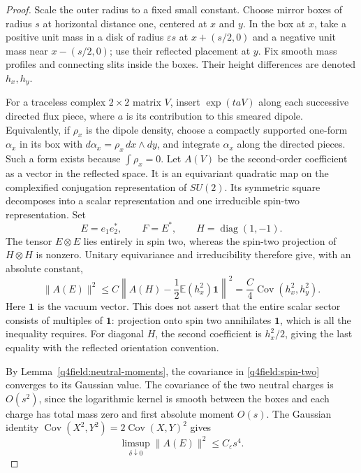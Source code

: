 \begin{proof}
Scale the outer radius to a fixed small constant.  Choose mirror boxes
of radius $s$ at horizontal distance one, centered at $x$ and $y$.
In the box at $x$, take a positive unit mass in a disk of radius
$\varepsilon s$ at $x+(s/2,0)$ and a negative unit mass near
$x-(s/2,0)$; use their reflected placement at $y$.  Fix smooth mass
profiles and connecting slits inside the boxes.  Their height
differences are denoted $h_x,h_y$.

For a traceless complex $2\times2$ matrix $V$, insert
$\exp(taV)$ along each successive directed flux piece, where $a$ is
its contribution to this smeared dipole.  Equivalently, if $\rho_x$
is the dipole density, choose a compactly supported one-form
$\alpha_x$ in its box with $d\alpha_x=\rho_x\,dx\wedge dy$,
and integrate $\alpha_x$ along the directed pieces.  Such a form
exists because $\int\rho_x=0$.  Let $A(V)$ be the
second-order coefficient as a vector in the reflected space.  It is
an equivariant quadratic map on the complexified conjugation
representation of $SU(2)$.  Its symmetric square decomposes into a
scalar representation and one irreducible spin-two representation.
Set
\[
 E=e_1e_2^*,\qquad F=E^*,\qquad H=\operatorname{diag}(1,-1).
\]
The tensor $E\otimes E$ lies entirely in spin two, whereas the
spin-two projection of $H\otimes H$ is nonzero.  Unitary equivariance
and irreducibility therefore give, with an absolute constant,
\begin{equation}\label{q4field:spin-two}
 \|A(E)\|^2
 \le C\left\|A(H)-\frac12\mathbb E(h_x^2)\mathbf1\right\|^2
 =\frac C4\operatorname{Cov}(h_x^2,h_y^2).
\end{equation}
Here $\mathbf1$ is the vacuum vector.  This does not assert that the
entire scalar sector consists of multiples of $\mathbf1$: projection
onto spin two annihilates $\mathbf1$, which is all the inequality
requires.  For diagonal $H$, the second coefficient is $h_x^2/2$,
giving the last equality with the reflected orientation convention.

By Lemma~\ref{q4field:neutral-moments}, the covariance in
\eqref{q4field:spin-two} converges to its Gaussian value.  The covariance
of the two neutral charges is $O(s^2)$, since the logarithmic kernel
is smooth between the boxes and each charge has total mass zero and
first absolute moment $O(s)$.  The Gaussian identity
$\operatorname{Cov}(X^2,Y^2)=2\operatorname{Cov}(X,Y)^2$ gives
\begin{equation}\label{q4field:spin-upper}
 \limsup_{\delta\downarrow0}\|A(E)\|^2\le C_\varepsilon s^4.
\end{equation}


\end{proof}
